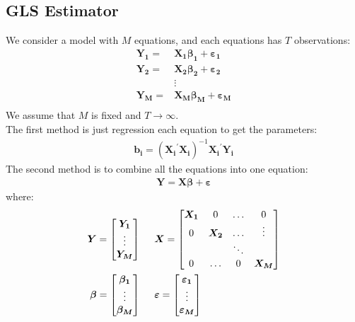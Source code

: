 \documentclass{article}
\begin{document}
\subsection{GLS Estimator}
We consider a model with $M$ equations, and each equations has $T$ observations:
	\begin{align*}
		\boldsymbol{Y_1} = &\boldsymbol{X_1} \boldsymbol{\beta_1} + \boldsymbol{\varepsilon_1}\\
		\boldsymbol{Y_2} = &\boldsymbol{X_2} \boldsymbol{\beta_2} + \boldsymbol{\varepsilon_2}\\
		&\vdots\\
		\boldsymbol{Y_M} = &\boldsymbol{X_M} \boldsymbol{\beta_M} + \boldsymbol{\varepsilon_M}\\
	\end{align*}
We assume that $M$ is fixed and $T \to \infty$.\\
The first method is just regression each equation to get the parameters:
	\begin{align*}
		\boldsymbol{b_i} = (\boldsymbol{X_i}^\prime \boldsymbol{X_i})^{-1} \boldsymbol{X_i}^\prime \boldsymbol{Y_i}
	\end{align*}
The second method is to combine all the equations into one equation:
	\begin{align*}
		\boldsymbol{Y} = \boldsymbol{X} \boldsymbol{\beta} + \boldsymbol{\varepsilon}
	\end{align*}
where:
	\begin{align*}
		\boldsymbol{Y} = 
		\begin{bmatrix}
			\boldsymbol{Y_1}\\
			\vdots\\
			\boldsymbol{Y_M}
		\end{bmatrix}&\indent
		\boldsymbol{X} = 
		\begin{bmatrix}
			\boldsymbol{X_1} & 0 & \ldots & 0\\
			0 & \boldsymbol{X_2} & \ldots & \vdots\\
			& & \ddots &\\
			0 & \ldots & 0 & \boldsymbol{X_M} 
		\end{bmatrix}\\
		\boldsymbol{\beta} = 
		\begin{bmatrix}
			\boldsymbol{\beta_1}\\
			\vdots\\
			\boldsymbol{\beta_M}
		\end{bmatrix}&\indent
		\boldsymbol{\varepsilon} = 
		\begin{bmatrix}
			\boldsymbol{\varepsilon_1}\\
			\vdots\\
			\boldsymbol{\varepsilon_M}
		\end{bmatrix}
	\end{align*}
\end{document}
